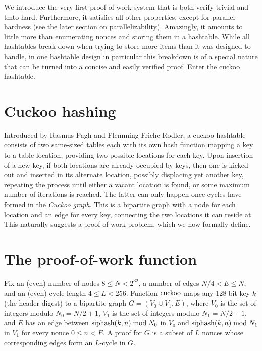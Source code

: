 \documentclass[11pt, oneside]{article}
\newcommand{\cuckoo}{{\rm cuckoo}}
\newcommand{\hash}{{\rm siphash}}
\begin{document}
We introduce the very first proof-of-work system that is both verify-trivial
and tmto-hard. Furthermore, it satisfies all other properties,
except for parallel-hardness (see the later section on parallelizability).
Amazingly, it amounts to little more than enumerating nonces and storing them
in a hashtable. While all hashtables break down when trying to store more items than
it was designed to handle, in one hashtable design in particular this breakdown
is of a special nature that can be turned into a concise and easily verified proof.
Enter the cuckoo hashtable.

\section{Cuckoo hashing}
Introduced by Rasmus Pagh and Flemming Friche Rodler\cite{Pagh04cuckoohashing},
a cuckoo hashtable consists of two same-sized
tables each with its own hash function mapping a key to a table location,
providing two possible locations for each key.
Upon insertion of a new key, if both locations are already occupied by keys,
then one is kicked out and inserted in its alternate location, possibly
displacing yet another key, repeating the process until either a vacant
location is found, or some maximum number of iterations is reached.
The latter can only happen once cycles have formed in the {\em Cuckoo graph}.
This is a bipartite graph with a node for each location and an
edge for every key, connecting the two locations it can reside at.
This naturally suggests a proof-of-work problem, which we now formally define.

\section{The proof-of-work function}
Fix an (even) number of nodes $8 \leq N < 2^{32}$, a number of edges $N/4 < E \leq N$,
and an (even) cycle length $4 \leq L < 256$.
Function $\cuckoo$ maps any 128-bit key $k$ (the header digest) to a bipartite graph
$G = (V_0 \cup V_1, E)$, where $V_0$ is the set of integers modulo $N_0=N/2+1$,
$V_1$ is the set of integers modulo $N_1=N/2-1$, and $E$ has an edge between
$\hash(k,n) \bmod N_0$ in $V_0$ and $\hash(k,n) \bmod N_1$ in $V_1$ for every
nonce $0 \leq n < E$. A proof for $G$ is a subset of $L$ nonces whose
corresponding edges form an $L$-cycle in $G$.
\end{document}
